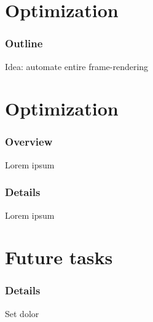 \documentclass{beamer}
\begin{document}
\section{Optimization}
\begin{frame} %
	\frametitle{Outline}
	Idea: automate entire frame-rendering
\end{frame}

\section{Optimization}
\begin{frame} %
	\frametitle{Overview} %
	Lorem ipsum
\end{frame}

\begin{frame} %
	\frametitle{Details} %
	Lorem ipsum
\end{frame}

\section{Future tasks}
\begin{frame} %
	\frametitle{Details} %
	Set dolor
\end{frame}
\end{document}
